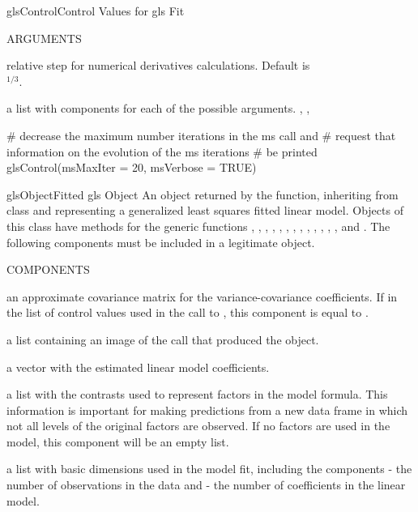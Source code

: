 \documentclass[pdftex]{article} \usepackage{url,graphicx}
\begin{document}
\begin{Helpfile}{glsControl}{Control Values for gls Fit}
\begin{Argument}{ARGUMENTS}
\item[\Co{.relStep:}]
relative step for numerical derivatives
calculations. Default is \\ $^{1/3}$.
\end{Argument}
a list with components for each of the possible arguments.
, , 
\need 15pt
\vspace{-16pt} 
\begin{Example}
# decrease the maximum number iterations in the ms call and
# request that information on the evolution of the ms iterations 
# be printed
glsControl(msMaxIter = 20, msVerbose = TRUE)
\end{Example}
\end{Helpfile}
\begin{Helpfile}{glsObject}{Fitted gls Object}
An object returned by the  function, inheriting from class
 and representing a generalized least squares fitted linear 
model. Objects of this class have methods for the generic functions 
, , , ,
, , , ,
, , , ,
, and .
The following components must be included in a legitimate 
object. 
\begin{Argument}{COMPONENTS}
\item[\Co{apVar:}]
an approximate covariance matrix for the
variance-covariance coefficients. If  in the list
of control values used in the call to , this
component is equal to .
\item[\Co{call:}]
a list containing an image of the  call that
produced the object.
\item[\Co{coefficients:}]
a vector with the estimated linear model
coefficients.
\item[\Co{contrasts:}]
a list with the contrasts used to represent factors
in the model formula. This information is important for making
predictions from a new data frame in which not all levels of the
original factors are observed. If no factors are used in the model,
this component will be an empty list.
\item[\Co{dims:}]
a list with basic dimensions used in the model fit,
including the components  - the number of observations in
the data and  - the number of coefficients in the linear
model.
\item[\Co{fitted:}]

\end{Argument}
\end{Helpfile}
\end{document}
